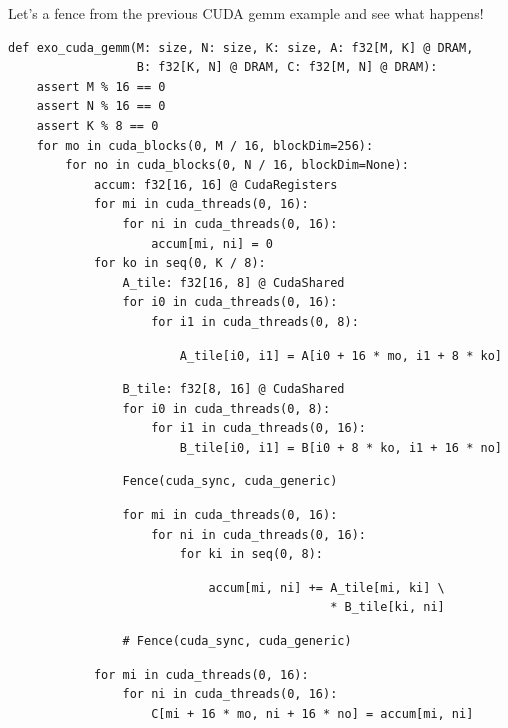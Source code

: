 \begin{minipage}[t]{0.4\textwidth}\codeminipage
Let's  a fence from the previous CUDA gemm example and see what happens!
\vspace{6mm}
\tiny
\begin{verbatim}
def exo_cuda_gemm(M: size, N: size, K: size, A: f32[M, K] @ DRAM,
                  B: f32[K, N] @ DRAM, C: f32[M, N] @ DRAM):
    assert M % 16 == 0
    assert N % 16 == 0
    assert K % 8 == 0
    for mo in cuda_blocks(0, M / 16, blockDim=256):
        for no in cuda_blocks(0, N / 16, blockDim=None):
            accum: f32[16, 16] @ CudaRegisters
            for mi in cuda_threads(0, 16):
                for ni in cuda_threads(0, 16):
                    accum[mi, ni] = 0
            for ko in seq(0, K / 8):
                A_tile: f32[16, 8] @ CudaShared
                for i0 in cuda_threads(0, 16):
                    for i1 in cuda_threads(0, 8):
\end{verbatim}
\begin{mdframed}[style=MyFrame, backgroundcolor=yellowBoxBg]
\color{yellowBoxFg}
\begin{verbatim}
                        A_tile[i0, i1] = A[i0 + 16 * mo, i1 + 8 * ko]
\end{verbatim}
\end{mdframed}
\begin{verbatim}
                B_tile: f32[8, 16] @ CudaShared
                for i0 in cuda_threads(0, 8):
                    for i1 in cuda_threads(0, 16):
                        B_tile[i0, i1] = B[i0 + 8 * ko, i1 + 16 * no]
\end{verbatim}
\begin{mdframed}[style=MyFrame, backgroundcolor=greenBoxBg]
\color{greenBoxFg}
\begin{verbatim}
                Fence(cuda_sync, cuda_generic)
\end{verbatim}
\end{mdframed}
\begin{verbatim}
                for mi in cuda_threads(0, 16):
                    for ni in cuda_threads(0, 16):
                        for ki in seq(0, 8):
\end{verbatim}
\begin{mdframed}[style=MyFrame, backgroundcolor=violetBoxBg]
\color{violetBoxFg}
\begin{verbatim}
                            accum[mi, ni] += A_tile[mi, ki] \
                                             * B_tile[ki, ni]
\end{verbatim}
\end{mdframed}
\begin{mdframed}[style=MyFrame, backgroundcolor=redBoxBg]
\color{redBoxFg}
\begin{verbatim}
                # Fence(cuda_sync, cuda_generic)
\end{verbatim}
\end{mdframed}
\begin{verbatim}
            for mi in cuda_threads(0, 16):
                for ni in cuda_threads(0, 16):
                    C[mi + 16 * mo, ni + 16 * no] = accum[mi, ni]
\end{verbatim}

\end{minipage}
